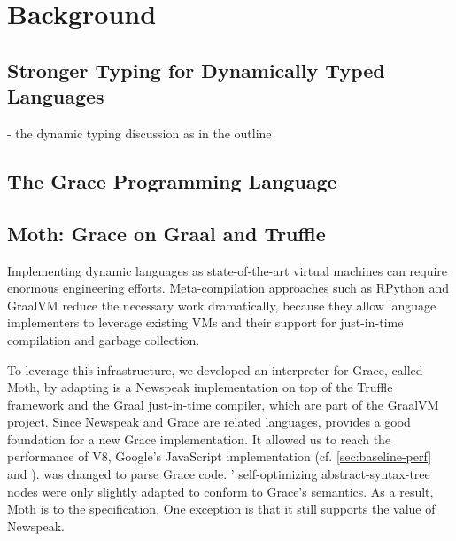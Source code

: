 
\section{Background}
\label{sec:background}

\subsection{Stronger Typing for Dynamically Typed Languages}

\begin{cnote}
- the dynamic typing discussion as in the outline
\end{cnote}

\subsection{The Grace Programming Language}



\subsection{Moth: Grace on Graal and Truffle}
\label{ssec:moth}

Implementing dynamic languages as state-of-the-art virtual machines
can require enormous engineering efforts.
Meta-compilation approaches\citep{Marr:2015:MTPE}
such as RPython\citep{Bolz:2009:TMP,Bolz:2013:IMT}
and GraalVM\citep{Wurthinger2013,Wurthinger:2017:PPE}
reduce the necessary work dramatically,
because they allow language implementers to leverage existing VMs
and their support for just-in-time compilation and garbage collection.

To leverage this infrastructure, we developed an interpreter for Grace,
called Moth\citep{Roberts2017}, by adapting
\SOMns is a Newspeak implementation\citep{Bracha:10:NS} on top of the Truffle framework and the Graal just-in-time compiler,
which are part of the GraalVM project.
Since Newspeak and Grace are related languages,
\SOMns provides a good foundation for a new Grace implementation.
It allowed us to reach the performance of V8,
Google's JavaScript implementation
(cf. \cref{sec:baseline-perf} and \citet{Marr2016}).
\SOMns was changed to parse Grace code.
\SOMns' self-optimizing abstract-syntax-tree nodes were only slightly adapted to conform to Grace's semantics.
As a result, Moth is  to the specification.
One exception is that it still supports the  value of Newspeak.


